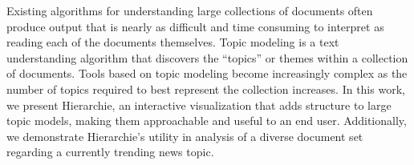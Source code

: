 Existing algorithms for understanding large collections of documents often produce output that is nearly as difficult and time consuming to interpret as reading each of the documents themselves. Topic modeling is a text understanding algorithm that discovers the ``topics'' or themes within a collection of documents. Tools based on topic modeling become increasingly complex as the number of topics required to best represent the collection increases. In this work, we present Hierarchie, an interactive visualization that adds structure to large topic models, making them approachable and useful to an end user. Additionally, we demonstrate Hierarchie's utility in analysis of a diverse document set regarding a currently trending news topic.
